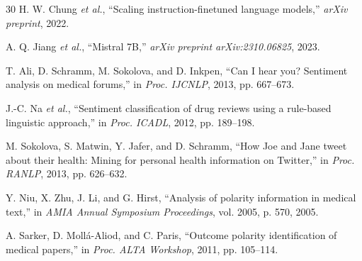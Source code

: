 \documentclass[conference]{IEEEtran}
\begin{document}
\begin{thebibliography}{30}
H. W. Chung \textit{et al.},
``Scaling instruction-finetuned language models,''
\textit{arXiv preprint}, 2022.

A. Q. Jiang \textit{et al.},
``Mistral 7B,''
\textit{arXiv preprint arXiv:2310.06825}, 2023.

T. Ali, D. Schramm, M. Sokolova, and D. Inkpen,
``Can I hear you? Sentiment analysis on medical forums,''
in \textit{Proc. IJCNLP}, 2013, pp. 667--673.

J.-C. Na \textit{et al.},
``Sentiment classification of drug reviews using a rule-based linguistic approach,''
in \textit{Proc. ICADL}, 2012, pp. 189--198.

M. Sokolova, S. Matwin, Y. Jafer, and D. Schramm,
``How Joe and Jane tweet about their health: Mining for personal health information on Twitter,''
in \textit{Proc. RANLP}, 2013, pp. 626--632.

Y. Niu, X. Zhu, J. Li, and G. Hirst,
``Analysis of polarity information in medical text,''
in \textit{AMIA Annual Symposium Proceedings}, vol. 2005, p. 570, 2005.

A. Sarker, D. Moll{\'a}-Aliod, and C. Paris,
``Outcome polarity identification of medical papers,''
in \textit{Proc. ALTA Workshop}, 2011, pp. 105--114.

\end{thebibliography}

\balance
\end{document}
